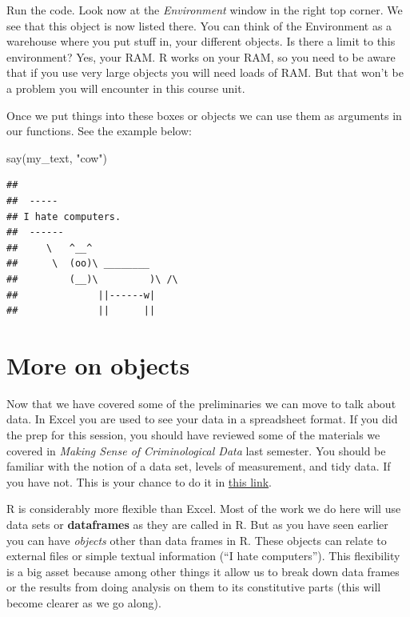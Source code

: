 \documentclass[
]{book}
\newenvironment{Shaded}{\begin{snugshade}}{\end{snugshade}}
\newcommand{\FunctionTok}[1]{\textcolor[rgb]{0.00,0.00,0.00}{#1}}
\newcommand{\NormalTok}[1]{#1}
\newcommand{\StringTok}[1]{\textcolor[rgb]{0.31,0.60,0.02}{#1}}
\begin{document}
Run the code. Look now at the \emph{Environment} window in the right top corner. We see that this object is now listed there. You can think of the Environment as a warehouse where you put stuff in, your different objects. Is there a limit to this environment? Yes, your RAM. R works on your RAM, so you need to be aware that if you use very large objects you will need loads of RAM. But that won't be a problem you will encounter in this course unit.

Once we put things into these boxes or objects we can use them as arguments in our functions. See the example below:

\begin{Shaded}
\begin{Highlighting}[]
\FunctionTok{say}\NormalTok{(my\_text, }\StringTok{"cow"}\NormalTok{)}
\end{Highlighting}
\end{Shaded}

\begin{verbatim}
## 
##  ----- 
## I hate computers. 
##  ------ 
##     \   ^__^ 
##      \  (oo)\ ________ 
##         (__)\         )\ /\ 
##              ||------w|
##              ||      ||
\end{verbatim}

\hypertarget{more-on-objects}{%
\section{More on objects}\label{more-on-objects}}

Now that we have covered some of the preliminaries we can move to talk about data. In Excel you are used to see your data in a spreadsheet format. If you did the prep for this session, you should have reviewed some of the materials we covered in \emph{Making Sense of Criminological Data} last semester. You should be familiar with the notion of a data set, levels of measurement, and tidy data. If you have not. This is your chance to do it in \href{https://rawgit.com/maczokni/MSCD/master/book/bookdown-demo-master/bookdown-demo-master/docs/week1.html\#data-variables-and-observations}{this link}.

R is considerably more flexible than Excel. Most of the work we do here will use data sets or \textbf{dataframes} as they are called in R. But as you have seen earlier you can have \emph{objects} other than data frames in R. These objects can relate to external files or simple textual information (``I hate computers''). This flexibility is a big asset because among other things it allow us to break down data frames or the results from doing analysis on them to its constitutive parts (this will become clearer as we go along).
\end{document}
